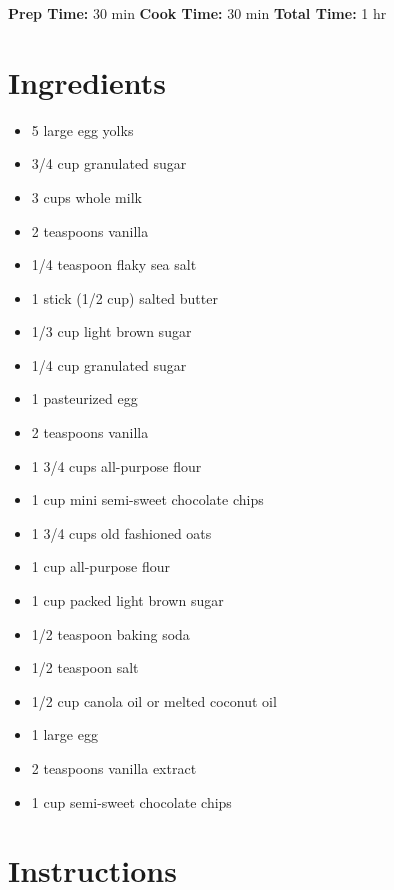 \documentclass[
  letterpaper,
  DIV=11,
  numbers=noendperiod,
  titlepage=false]{scrreprt}
\providecommand{\tightlist}{%
  \setlength{\itemsep}{0pt}\setlength{\parskip}{0pt}}\usepackage{longtable,booktabs,array}
\begin{document}
\textbf{Prep Time:} 30 min \textbar{} \textbf{Cook Time:} 30 min
\textbar{} \textbf{Total Time:} 1 hr

\section{Ingredients}\label{ingredients-73}

\begin{itemize}
\tightlist
\item
  5 large egg yolks
\item
  3/4 cup granulated sugar
\item
  3 cups whole milk
\item
  2 teaspoons vanilla
\item
  1/4 teaspoon flaky sea salt
\item
  1 stick (1/2 cup) salted butter
\item
  1/3 cup light brown sugar
\item
  1/4 cup granulated sugar
\item
  1 pasteurized egg
\item
  2 teaspoons vanilla
\item
  1 3/4 cups all-purpose flour
\item
  1 cup mini semi-sweet chocolate chips
\item
  1 3/4 cups old fashioned oats
\item
  1 cup all-purpose flour
\item
  1 cup packed light brown sugar
\item
  1/2 teaspoon baking soda
\item
  1/2 teaspoon salt
\item
  1/2 cup canola oil or melted coconut oil
\item
  1 large egg
\item
  2 teaspoons vanilla extract
\item
  1 cup semi-sweet chocolate chips
\end{itemize}

\section{Instructions}\label{instructions-73}
\end{document}
